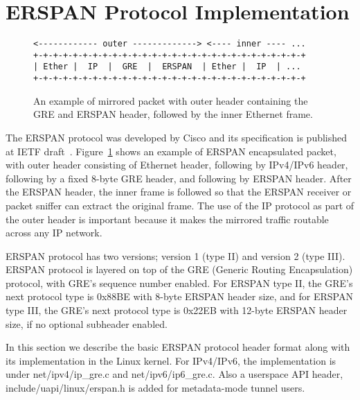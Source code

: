 \documentclass[10pt]{sigplanconf}
\begin{document}
\section{ERSPAN Protocol Implementation}
\begin{figure}
{\scriptsize
\begin{verbatim}
<------------ outer -------------> <---- inner ---- ...
+-+-+-+-+-+-+-+-+-+-+-+-+-+-+-+-+-+-+-+-+-+-+-+-+-+-+-+
| Ether |  IP  |  GRE  |  ERSPAN  | Ether |  IP  | ...   
+-+-+-+-+-+-+-+-+-+-+-+-+-+-+-+-+-+-+-+-+-+-+-+-+-+-+-+
\end{verbatim}
}
\vspace{-1.0em}
\caption{An example of mirrored packet with outer header containing
the GRE and ERSPAN header, followed by the inner Ethernet frame.}
\label{erspanhdr}
\vspace{-1.0em}
\end{figure}

The ERSPAN protocol was developed by Cisco and its specification is published at IETF
draft~\cite{erspan_ietf}. 
Figure~\ref{erspanhdr} shows an example of ERSPAN encapsulated
packet, with outer header consisting of Ethernet header, following by IPv4/IPv6
header, following by a fixed 8-byte GRE header, and following by ERSPAN header.
After the ERSPAN header, the inner frame is followed so that the ERSPAN receiver
or packet sniffer can extract the original frame.
The use of the IP protocol as part of the outer header is important because it
makes the mirrored traffic routable across any IP network.

ERSPAN protocol has two versions; version 1 (type II) and
version 2 (type III). ERSPAN protocol is layered on top of the GRE (Generic Routing
Encapsulation) protocol, with GRE's sequence number enabled.  For ERSPAN type II,
the GRE's next protocol type is 0x88BE with 8-byte ERSPAN header size, and for
ERSPAN type III, the GRE's next protocol type is 0x22EB with 12-byte ERSPAN header
size, if no optional subheader enabled.

In this section we describe the basic ERSPAN protocol header format
along with its implementation in the Linux kernel.
For IPv4/IPv6, the implementation is under net/ipv4/ip\_gre.c and
net/ipv6/ip6\_gre.c. Also a userspace API header, include/uapi/linux/erspan.h
is added for metadata-mode tunnel users.
\end{document}
